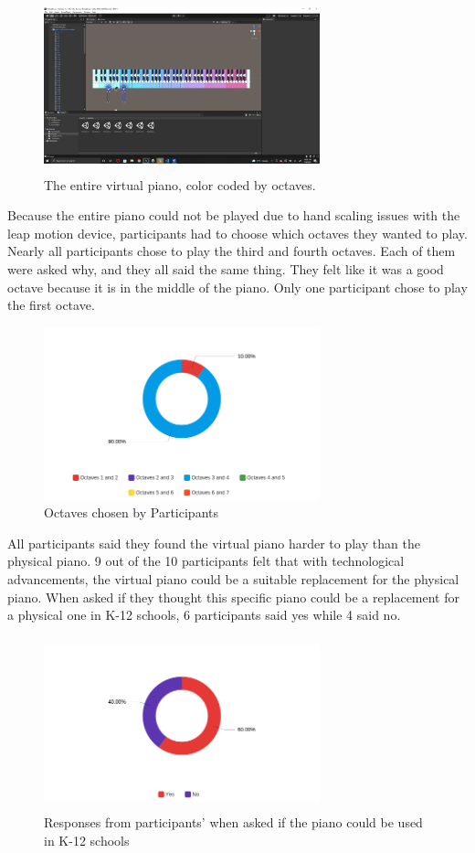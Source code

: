 \documentclass[sigconf,authordraft]{acmart}
\begin{document}
\begin{figure}[h]
\centering
\includegraphics[width=8cm, height=5cm]{WholePiano.png}
\centering
\caption{The entire virtual piano, color coded by octaves.}
\end{figure}

Because the entire piano could not be played due to hand scaling issues with the leap motion device, participants had to choose which octaves they wanted to play.  Nearly all participants chose to play the third and fourth octaves.  Each of them were asked why, and they all said the same thing.  They felt like it was a good octave because it is in the middle of the piano.  Only one participant chose to play the first octave.

\begin{figure}[h]
\centering
\includegraphics[width=8cm, height=5cm]{OctavesChosenBreakdown.png}
\centering
\caption{Octaves chosen by Participants}
\end{figure}


All participants said they found the virtual piano harder to play than the physical piano.  9 out of the 10 participants felt that with technological advancements, the virtual piano could be a suitable replacement for the physical piano.  When asked if they thought this specific piano could be a replacement for a physical one in K-12 schools, 6 participants said yes while 4 said no.

\begin{figure}[h]
\centering
\includegraphics[width=8cm, height=5cm]{K-12 Question.png}
\centering
\caption{Responses from participants' when asked if the piano could be used in K-12 schools}
\end{figure}
\end{document}
